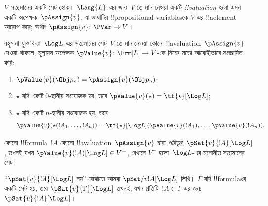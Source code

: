 \documentclass[../../../include/open-logic-section]{subfiles}
\begin{document}


\begin{defn}[!!^{valuation}s]
$V$ সত্যমানের একটি সেট হোক। $\Lang{L}$-এর জন্য~$V$-তে মান নেওয়া একটি
\emph{!!{valuation}} হলো এমন একটি অপেক্ষক~$\pAssign{v}$, যা ভাষাটির
!!{propositional variable}sকে $V$-এর !!a{element} আরোপ করে; অর্থাৎ
$\pAssign{v} \colon \PVar \to V$।
\end{defn}

\begin{defn}
  বহুমানী যুক্তিবিদ্যা~$\Log L$-এর সত্যমানের সেট~$V$-তে মান নেওয়া
  কোনো !!a{valuation}~$\pAssign{v}$ দেওয়া থাকলে, মূল্যায়ন অপেক্ষক
  $\pValue{v} \colon \Frm[L] \to V$-কে নিচের মতো আরোহীভাবে সংজ্ঞায়িত
  করি:
  \begin{enumerate}
    \item $\pValue{v}(\Obj p_n) = \pAssign{v}(\Obj p_n)$;
    \item $\star$ যদি একটি $0$-স্থানীয় সংযোজক হয়, তবে $\pValue{v}(\star)  = \tf{\star}[\Log L]$;
    \item $\star$ যদি একটি $n$-স্থানীয় সংযোজক হয়, তবে
    \[
      \pValue{v}(\star(!A_1, \dots, !A_n)) = \tf{\star}[\Log L]
      (\pValue{v}(!A_1), \dots, \pValue{v}(!A_n)).
    \]
  \end{enumerate}
\end{defn}

\begin{defn}[পরিতৃপ্তি]
 কোনো !!{formula}~$!A$ কোনো
  !!a{valuation}~$\pAssign{v}$ দ্বারা \emph{পরিতৃপ্ত},
  $\pSat{v}{!A}[\Log L]$, তখনই যখন $\pValue{v}(!A)[\Log L] \in V^+$,
  যেখানে $V^+$ হলো~$\Log L$-এর মনোনীত সত্যমানের সেট।

  “$\pSat{v}{!A}[\Log L]$ নয়” বোঝাতে আমরা
  $\pSat/{v}{!A}[\Log L]$ লিখি। $\Gamma$ যদি !!{formula}sর একটি সেট
  হয়, তবে $\pSat{v}{\Gamma}[\Log L]$ তখনই, যখন প্রতিটি~$!A \in
  \Gamma$-এর জন্য $\pSat{v}{!A}[\Log L]$।
\end{defn}
\end{document}
